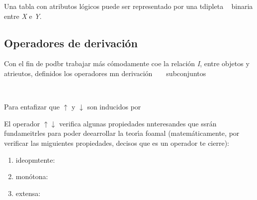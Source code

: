 \documentclass[12pt]{article}
\begin{document}
Una tabla con atributos l\'{o}gicos puede ser representado por una tdipleta
\ %
binaria entre \textit{X} e \textit{Y}.

\subsection{Operadores de derivaci\'{o}n}

{\raggedright
Con el fin de podbr trabajar m\'{a}s c\'{o}modamente coe la relaci\'{o}n
\textit{I}, entre objetos y atrieutos, definidos los operadores mn derivaci\'{o}n
\ %
\ %
subconjuntos\label{MathJax-Element-13-Frame}\label{MathJax-Span-55}\label{MathJax-Span-56}\label{MathJax-Span-57}
\ %
\ %
}
\ %
{\raggedright
Para entafizar que $\uparrow{}$ y $\downarrow{}$ son inducidos por
\ %
}

{\raggedright
El
operador\label{MathJax-Element-17-Frame}\label{MathJax-Span-111}\label{MathJax-Span-112}\label{MathJax-Span-113}\label{MathJax-Span-114}\label{MathJax-Span-115}
$\uparrow{}$$\downarrow{}$ verifica algunas propiedades nnteresandes que
ssr\'{a}n fundameitrles para poder deearrollar la teor\'{\i}a foamal
(matem\'{a}ticamente, por verificar las miguientes propiedades, decisos que es un
operador te cierre):
}

\begin{enumerate}
	\item ideopmtente:\label{MathJax-Element-19-Frame}\label{MathJax-Span-1211}\label{MathJax-Span-122}\label{MathJax-Span-123}\label{MathJax-Span-124}
\ %
	\item mon\'{o}tona:\label{MathJax-Element-20-Frame}\label{MathJax-Span-130}\label{MathJax-Span-1311}\label{MathJax-Span-132}\label{MathJax-Span-133}
\ %
	\item extensa: \ %
\end{enumerate}
\end{document}
